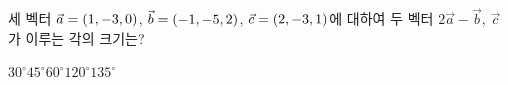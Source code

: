 세 벡터 $\vec{a}=(1{,}\mkern3mu\mathopen{}-3{,}\mkern3mu\mathopen{}0)$, $\vec{b}=(-1{,}\mkern3mu\mathopen{}-5{,}\mkern3mu\mathopen{}2)$, $\vec{c}=(2{,}\mkern3mu\mathopen{}-3{,}\mkern3mu\mathopen{}1)$에 대하여 두 벡터 $2\vec{a}-\vec{b}$, $\vec{c}$가 이루는 각의 크기는?
\begin{choices32}{$30^\circ$}{$45^\circ$}{$60^\circ$}{$120^\circ$}{$135^\circ$}\end{choices32}
